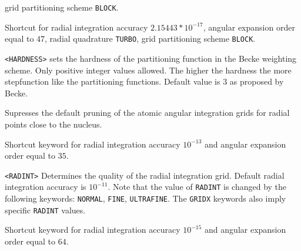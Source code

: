 \begin{description}
grid partitioning scheme \verb|BLOCK|.
\item[\Key{GRID5}]
Shortcut for radial integration accuracy $2.15443*10^{-17}$,
angular expansion order equal to $47$,
radial quadrature \verb|TURBO|,
grid partitioning scheme \verb|BLOCK|.
\item[\Key{HARDNESS}] \verb||\newline
\verb|<HARDNESS>|\newline
sets the hardness of the partitioning function in the Becke weighting scheme. Only positive integer values allowed. 
The higher the hardness the more stepfunction like the partitioning functions. 
Default value is $3$ as proposed by Becke.~\cite{dft-int:becke}
\item[\Key{NOPRUN}]
Supresses the default pruning of the atomic angular integration grids for radial points close to the nucleus. 
\item[\Key{NORMAL}]
Shortcut keyword for radial integration accuracy $10^{-13}$ and angular expansion order equal to $35$.
\item[\Key{RADINT}] \verb||\newline
\verb|<RADINT>|\newline
Determines the quality of the radial integration grid. Default radial integration accuracy is $10^{-11}$.
Note that the value of \verb|RADINT| is changed by the following keywords:
\verb|NORMAL|, \verb|FINE|, \verb|ULTRAFINE|.
The \verb|GRIDX| keywords also imply specific \verb|RADINT| values.
\item[\Key{ULTRAF}]
Shortcut keyword for radial integration accuracy $10^{-15}$ and angular expansion order equal to $64$.
\end{description}

